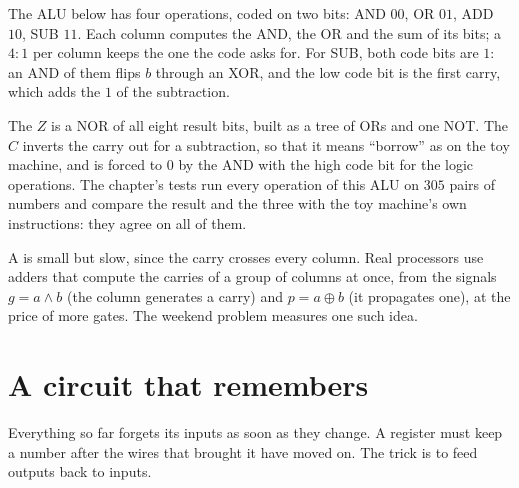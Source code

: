 The ALU below has four operations, coded on two bits: AND $00$, OR $01$, ADD $10$, SUB $11$. Each column computes
the AND, the OR and the sum of its bits; a $4{:}1$  per column keeps the one the code asks for. For SUB,
both code bits are $1$: an AND of them flips $b$ through an XOR, and the low code bit is the first carry, which adds
the $1$ of the subtraction.

\label{lst:g11:gates-to-arithmetic-unit:alu}

\label{out:g11:gates-to-arithmetic-unit:alu}

The  $Z$ is a NOR of all eight result bits, built as a tree of ORs and one NOT. The  $C$ inverts the carry out
for a subtraction, so that it means ``borrow'' as on the toy machine, and is forced to $0$ by the AND with the high
code bit for the logic operations. The chapter's tests run every operation of this ALU on $305$ pairs of numbers and
compare the result and the three  with the toy machine's own instructions: they agree on all of them.

\begin{inpractice}
A  is small but slow, since the carry crosses every column. Real processors use adders that
compute the carries of a group of columns at once, from the signals $g = a \wedge b$ (the column generates a carry)
and $p = a \oplus b$ (it propagates one), at the price of more gates. The weekend problem measures one such idea.
\end{inpractice}

\section{A circuit that remembers}\label{sec:g11:gates-to-arithmetic-unit:latch}

Everything so far forgets its inputs as soon as they change. A register must keep a number after the wires that
brought it have moved on. The trick is to feed outputs back to inputs.

